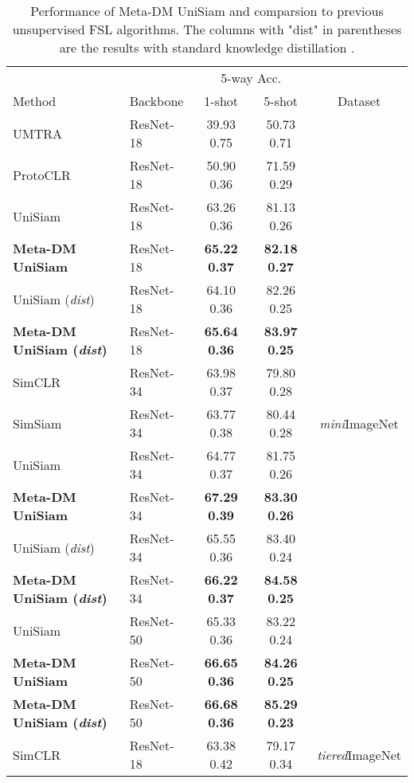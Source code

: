 \documentclass{article}
\begin{document}
\begin{table}
	\caption{Performance of Meta-DM  UniSiam and comparsion to previous unsupervised FSL algorithms. The columns with "dist" in parentheses are the results with standard knowledge distillation \cite{i49}. }
	\centering
	\begin{tabular}{llccc}
		\toprule
		& & \multicolumn{2}{c}{5-way Acc.} &  \\
		Method  & Backbone   & 1-shot     & 5-shot & Dataset \\
		\midrule
		UMTRA \cite{i41} & ResNet-18 & 39.93  0.75  & 50.73  0.71  &  \multirow{15}{*}{\textit{mini}ImageNet}    \\
		ProtoCLR \cite{i42} & ResNet-18 & 50.90  0.36 & 71.59  0.29  &     \\
		UniSiam \cite{i10} & ResNet-18 & 63.26  0.36  & 81.13  0.26  &  \\
		\textbf{Meta-DM  UniSiam} & ResNet-18 & \textbf{65.22  0.37}  &  \textbf{ 82.18  0.27 } &  \\
		UniSiam (\textit{dist}) & ResNet-18 & 64.10  0.36  & 82.26  0.25  &  \\
		\textbf{Meta-DM  UniSiam (\textit{dist})} & ResNet-18 & \textbf{65.64  0.36}  &  \textbf{ 83.97  0.25 } &  \\
		\cmidrule(r){1-4}
		SimCLR \cite{i32} & ResNet-34 & 63.98  0.37   & 79.80  0.28  &  \\
		SimSiam \cite{i43} & ResNet-34 & 63.77  0.38  & 80.44  0.28  &  \\
		UniSiam \cite{i10} & ResNet-34 & 64.77  0.37  & 81.75  0.26  &  \\			
		\textbf{Meta-DM  UniSiam} & ResNet-34 & \textbf{67.29  0.39}  &  \textbf{ 83.30  0.26 } &  \\
		UniSiam (\textit{dist})  & ResNet-34 & 65.55  0.36  & 83.40  0.24  &  \\		
		\textbf{Meta-DM  UniSiam (\textit{dist})} & ResNet-34 & \textbf{66.22  0.37}  &  \textbf{ 84.58  0.25 } &  \\
		\cmidrule(r){1-4}
		UniSiam \cite{i10} & ResNet-50 & 65.33  0.36  & 83.22  0.24  &  \\
		\textbf{Meta-DM  UniSiam} & ResNet-50 & \textbf{66.65  0.36}  &  \textbf{ 84.26  0.25 } &  \\		
		\textbf{Meta-DM  UniSiam (\textit{dist})} & ResNet-50 & \textbf{66.68  0.36}  &  \textbf{ 85.29  0.23 } &  \\
		\midrule
		SimCLR \cite{i32} & ResNet-18 & 63.38  0.42   & 79.17  0.34  & \multirow{14}{*}{\textit{tiered}ImageNet} \\

\end{tabular}
\end{table}
\end{document}
